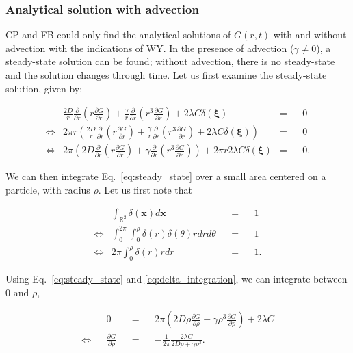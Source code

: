 \subsubsection*{Analytical solution with advection}

CP and FB could only find the analytical solutions of $G(r,t)$ with and without advection with the indications of WY. In the presence of advection ($\gamma\neq0$), a steady-state solution
can be found; without advection, there is no steady-state and the solution changes through time. Let us first examine the steady-state solution, given by:

\begin{align}
  &  \frac{2D}{r}\frac{\partial}{\partial r}\left(r\frac{\partial G}{\partial r}\right)+\frac{\gamma}{r}\frac{\partial}{\partial r}\left(r^{3}\frac{\partial G}{\partial r}\right)+2\lambda C\delta(\boldsymbol{\xi})\nonumber & = & & 0 \\
\Leftrightarrow & 2\pi r\left(\frac{2D}{r}\frac{\partial}{\partial r}\left(r\frac{\partial G}{\partial r}\right)+\frac{\gamma}{r}\frac{\partial}{\partial r}\left(r^{3}\frac{\partial G}{\partial r}\right)+2\lambda C\delta(\boldsymbol{\xi})\right)\nonumber & = & & 0 \\
 \Leftrightarrow  & 2\pi\left(2D\frac{\partial}{\partial r}\left(r\frac{\partial G}{\partial r}\right)+\gamma\frac{\partial}{\partial r}\left(r^{3}\frac{\partial G}{\partial r}\right)\right)+2\pi r2\lambda C\delta(\boldsymbol{\xi}) & = & & 0.\label{eq:steady_state}
\end{align}

We can then integrate Eq.~\ref{eq:steady_state} over a small area centered on a particle, with radius $\rho$. Let us first note that

\begin{align}
& \int_{\mathbb{R}^{2}}\delta(\boldsymbol{x})d\boldsymbol{x} & & = & & 1\nonumber \\
\Leftrightarrow & \int_{0}^{2\pi}\int_{0}^{\rho}\delta(r)\delta(\theta)rdrd\theta & & = & & 1\nonumber \\
\Leftrightarrow & 2\pi\int_{0}^{\rho}\delta(r)rdr & & = & & 1.\label{eq:delta_integration}
\end{align}

Using Eq.~\ref{eq:steady_state} and \ref{eq:delta_integration}, we can integrate between 0 and $\rho$, 

\begin{align}
 & & 0 & & = & & 2\pi\left(2D\rho\frac{\partial G}{\partial \rho}+\gamma\rho^{3}\frac{\partial G}{\partial \rho}\right)+2\lambda C\nonumber \\
\Leftrightarrow & & \frac{\partial G}{\partial \rho} & & = & & -\frac{1}{2\pi}\frac{2\lambda C}{2D\rho+\gamma\rho^{3}}.\label{eq:deriv_G_r}
\end{align}

